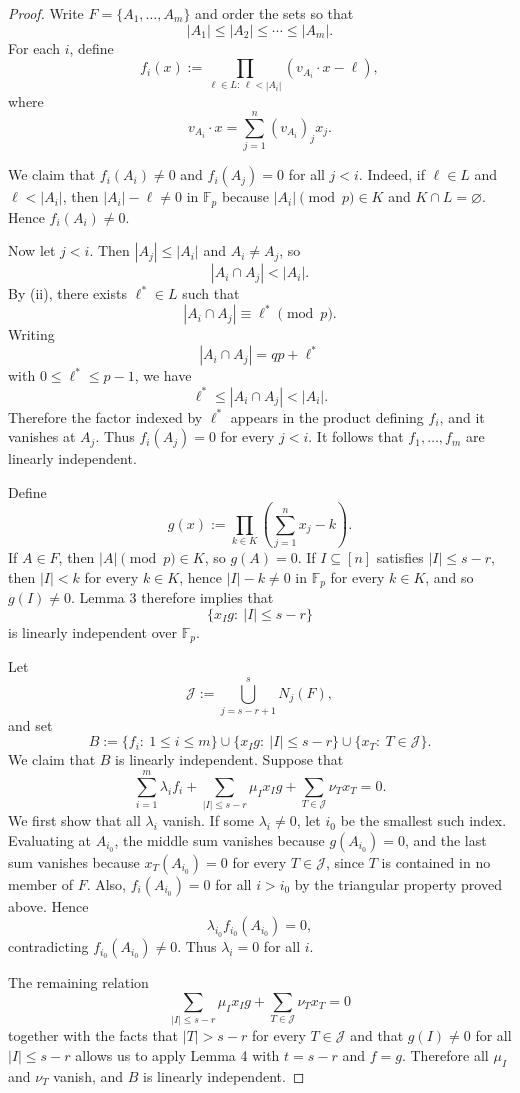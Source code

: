 \documentclass[11pt]{article}
\theoremstyle{plain}
\theoremstyle{remark}
\begin{document}
\begin{proof}
Write $F=\{A_1,\ldots,A_m\}$ and order the sets so that
$$
|A_1|\le |A_2|\le \cdots \le |A_m|.
$$
For each $i$, define
$$
f_i(x):=\prod_{\ell\in L:\,\ell<|A_i|}(v_{A_i}\cdot x-\ell),
$$
where
$$
v_{A_i}\cdot x=\sum_{j=1}^n (v_{A_i})_j x_j.
$$

We claim that $f_i(A_i)\neq 0$ and $f_i(A_j)=0$ for all $j<i$. Indeed, if $\ell\in L$ and
$\ell<|A_i|$, then $|A_i|-\ell\neq 0$ in $\mathbb F_p$ because $|A_i| \pmod p \in K$ and
$K\cap L=\varnothing$. Hence $f_i(A_i)\neq 0$.

Now let $j<i$. Then $|A_j|\le |A_i|$ and $A_i\neq A_j$, so
$$
|A_i\cap A_j|<|A_i|.
$$
By (ii), there exists $\ell^*\in L$ such that
$$
|A_i\cap A_j|\equiv \ell^* \pmod p.
$$
Writing
$$
|A_i\cap A_j|=qp+\ell^*
$$
with $0\le \ell^*\le p-1$, we have
$$
\ell^*\le |A_i\cap A_j|<|A_i|.
$$
Therefore the factor indexed by $\ell^*$ appears in the product defining $f_i$, and it vanishes at
$A_j$. Thus $f_i(A_j)=0$ for every $j<i$. It follows that $f_1,\ldots,f_m$ are linearly
independent.

Define
$$
g(x):=\prod_{k\in K}\left(\sum_{j=1}^n x_j-k\right).
$$
If $A\in F$, then $|A|\pmod p\in K$, so $g(A)=0$. If $I\subseteq [n]$ satisfies $|I|\le s-r$, then
$|I|<k$ for every $k\in K$, hence $|I|-k\neq 0$ in $\mathbb F_p$ for every $k\in K$, and so
$g(I)\neq 0$. Lemma 3 therefore implies that
$$
\{x_Ig:\ |I|\le s-r\}
$$
is linearly independent over $\mathbb F_p$.

Let
$$
\mathcal J:=\bigcup_{j=s-r+1}^{s} N_j(F),
$$
and set
$$
B:=\{f_i:\ 1\le i\le m\}\cup \{x_Ig:\ |I|\le s-r\}\cup \{x_T:\ T\in\mathcal J\}.
$$
We claim that $B$ is linearly independent. Suppose that
$$
\sum_{i=1}^m \lambda_i f_i+\sum_{|I|\le s-r}\mu_Ix_Ig+\sum_{T\in\mathcal J}\nu_Tx_T=0.
$$
We first show that all $\lambda_i$ vanish. If some $\lambda_i\neq 0$, let $i_0$ be the smallest such
index. Evaluating at $A_{i_0}$, the middle sum vanishes because $g(A_{i_0})=0$, and the last sum
vanishes because $x_T(A_{i_0})=0$ for every $T\in\mathcal J$, since $T$ is contained in no member
of $F$. Also, $f_i(A_{i_0})=0$ for all $i>i_0$ by the triangular property proved above. Hence
$$
\lambda_{i_0}f_{i_0}(A_{i_0})=0,
$$
contradicting $f_{i_0}(A_{i_0})\neq 0$. Thus $\lambda_i=0$ for all $i$.

The remaining relation
$$
\sum_{|I|\le s-r}\mu_Ix_Ig+\sum_{T\in\mathcal J}\nu_Tx_T=0
$$
together with the facts that $|T|>s-r$ for every $T\in\mathcal J$ and that $g(I)\neq 0$ for all
$|I|\le s-r$ allows us to apply Lemma 4 with $t=s-r$ and $f=g$. Therefore all $\mu_I$ and
$\nu_T$ vanish, and $B$ is linearly independent.


\end{proof}
\end{document}
